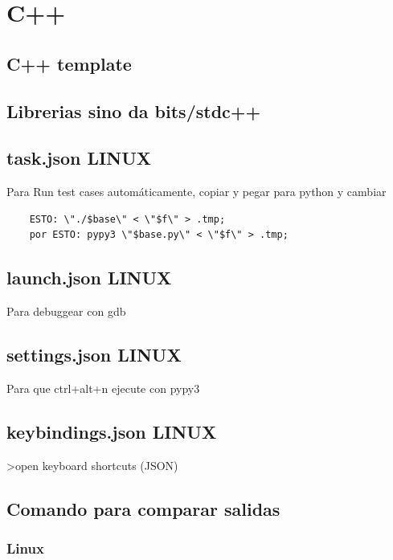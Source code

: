 \section{C++}
\subsection{C++ template}
\raggedbottom
\hrulefill
\subsection{Librerias sino da bits/stdc++}
\raggedbottom
\hrulefill
\subsection{task.json LINUX}
Para Run test cases automáticamente, copiar y pegar para python y cambiar
\begin{verbatim}
    ESTO: \"./$base\" < \"$f\" > .tmp;
    por ESTO: pypy3 \"$base.py\" < \"$f\" > .tmp;
\end{verbatim}
\raggedbottom
\hrulefill
\subsection{launch.json LINUX}
Para debuggear con gdb
\raggedbottom
\hrulefill
\subsection{settings.json LINUX}
Para que ctrl+alt+n ejecute con pypy3
\raggedbottom
\hrulefill

\subsection{keybindings.json LINUX}
>open keyboard shortcuts (JSON)
\raggedbottom
\hrulefill
\subsection{Comando para comparar salidas}
\subsubsection{Linux}
\raggedbottom

